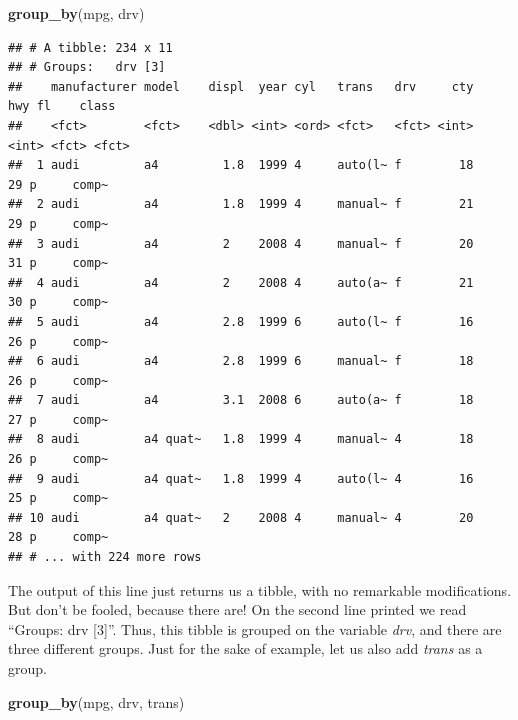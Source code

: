 \documentclass[]{tufte-book}
\newenvironment{Shaded}{}{}
\newcommand{\KeywordTok}[1]{\textcolor[rgb]{0.00,0.44,0.13}{\textbf{#1}}}
\newcommand{\NormalTok}[1]{#1}
\begin{document}
\begin{Shaded}
\begin{Highlighting}[]
\KeywordTok{group_by}\NormalTok{(mpg, drv)}
\end{Highlighting}
\end{Shaded}

\begin{verbatim}
## # A tibble: 234 x 11
## # Groups:   drv [3]
##    manufacturer model    displ  year cyl   trans   drv     cty   hwy fl    class
##    <fct>        <fct>    <dbl> <int> <ord> <fct>   <fct> <int> <int> <fct> <fct>
##  1 audi         a4         1.8  1999 4     auto(l~ f        18    29 p     comp~
##  2 audi         a4         1.8  1999 4     manual~ f        21    29 p     comp~
##  3 audi         a4         2    2008 4     manual~ f        20    31 p     comp~
##  4 audi         a4         2    2008 4     auto(a~ f        21    30 p     comp~
##  5 audi         a4         2.8  1999 6     auto(l~ f        16    26 p     comp~
##  6 audi         a4         2.8  1999 6     manual~ f        18    26 p     comp~
##  7 audi         a4         3.1  2008 6     auto(a~ f        18    27 p     comp~
##  8 audi         a4 quat~   1.8  1999 4     manual~ 4        18    26 p     comp~
##  9 audi         a4 quat~   1.8  1999 4     auto(l~ 4        16    25 p     comp~
## 10 audi         a4 quat~   2    2008 4     manual~ 4        20    28 p     comp~
## # ... with 224 more rows
\end{verbatim}

The output of this line just returns us a tibble, with no remarkable modifications. But don't be fooled, because there are! On the second line printed we read ``Groups: drv {[}3{]}''. Thus, this tibble is grouped on the variable \emph{drv}, and there are three different groups. Just for the sake of example, let us also add \emph{trans} as a group.

\begin{Shaded}
\begin{Highlighting}[]
\KeywordTok{group_by}\NormalTok{(mpg, drv, trans)}
\end{Highlighting}
\end{Shaded}
\end{document}
